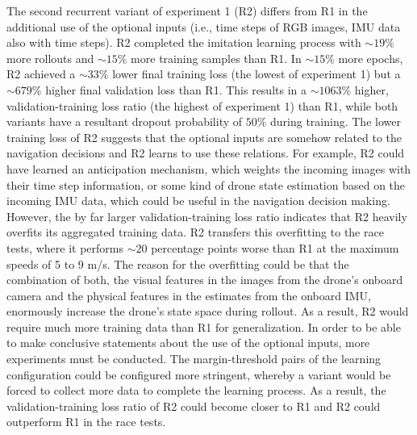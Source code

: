 The second recurrent variant of experiment 1 (R2)
differs from R1 in the additional use of the optional inputs
(i.e., time steps of RGB images, IMU data also with time steps).
R2 completed the imitation learning process with $\sim 19 \%$ more rollouts
and $\sim 15 \%$ more training samples than R1.
In $\sim 15 \%$ more epochs,
R2 achieved a $\sim 33 \%$ lower final training loss (the lowest of experiment 1)
but a $\sim 679 \%$ higher final validation loss than R1.
This results in a $\sim 1063 \%$ higher, validation-training loss ratio 
(the highest of experiment 1)
than R1, while both variants have a resultant dropout probability of $50 \%$ during training.
The lower training loss of R2 suggests that the optional inputs
are somehow related to the navigation decisions and R2 learns to use these relations.
For example, R2 could have learned an anticipation mechanism,
which weights the incoming images with their time step information,
or some kind of drone state estimation based on the incoming IMU data,
which could be useful in the navigation decision making.
However, the by far larger validation-training loss ratio 
indicates that R2 heavily overfits its aggregated training data.
R2 transfers this overfitting to the race tests,
where it performs $\sim 20$ percentage points worse than R1
at the maximum speeds of 5 to 9 m/s.
The reason for the overfitting could be that the combination of both, 
the visual features in the images from the drone's onboard camera
and the physical features in the estimates from the onboard IMU,
enormously increase the drone's state space during rollout.
As a result, R2 would require much more training data than R1 for generalization.
In order to be able to make conclusive statements about the use of the optional inputs,
more experiments must be conducted.
The margin-threshold pairs of the learning configuration could be configured more stringent,
whereby a variant would be forced to collect more data to complete the learning process.
As a result, the validation-training loss ratio of R2 could become closer to R1
and R2 could outperform R1 in the race tests.

